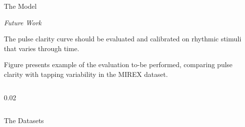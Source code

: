\documentclass[final]{beamer}
\newlength{\sepwidth}
\newcommand{\separatorcolumn}[1][\sepwidth]{\begin{column}{#1}\end{column}}
\begin{document}
\begin{frame}[t]
\begin{columns}[T]
\begin{column}{0.93\textwidth}
\begin{column}{0.5\textwidth}
\begin{block}{The Model}
    \end{block}
    \begin{block}{\normalsize \emph{Future Work}}
      \begin{minipage}{0.37\textwidth}
      {\small
        The pulse clarity curve should be evaluated and calibrated on
        rhythmic stimuli that varies through time.
      }
      \vspace{1cm}
      \par{}
      {\footnotesize
        Figure presents example of the evaluation to-be performed,
        comparing pulse clarity with tapping variability in the MIREX
        dataset. 
      }
      \end{minipage}
      \begin{minipage}{0.62\textwidth}
      \raggedleft
      \end{minipage}
    \end{block}
    \end{column}
    \separatorcolumn[0.02\textwidth]
    \begin{column}{0.472\textwidth}
        \begin{block}{The Datasets}
            {\small
            \begin{columns}
            \begin{column}{0.49\textwidth}
            

\end{column}
\end{columns}}
\end{block}
\end{column}
\end{column}
\end{columns}
\end{frame}
\end{document}

